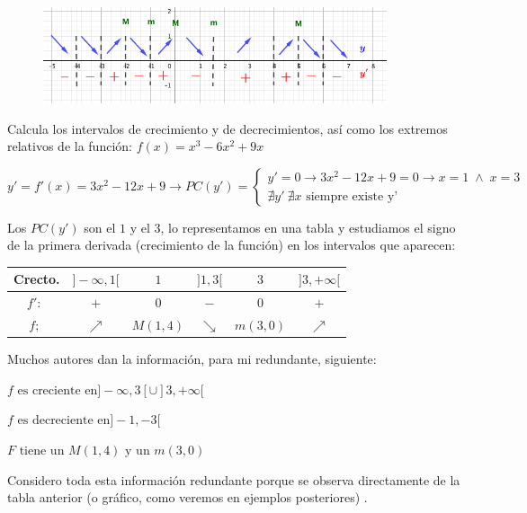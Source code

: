 	
	\begin{figure}[H]
		\centering
		\includegraphics[width=0.9\textwidth]{imagenes/imagenes05/T05IM07.png}
	\end{figure}
	
	\begin{ejem} Calcula los intervalos de crecimiento y de decrecimientos, así como los extremos relativos de la función:  $f(x)=x^3-6x^2+9x$
	
	$y'=f'(x)=3x^2-12 x+9 \to PC(y') =\begin{cases}
	y'=0 \to 3x^2-12x+9=0 \to x=1 \; \wedge \; x=3 \\
	\nexists y' \ \nexists x \mbox{ siempre existe y'}
	\end{cases}$
	
	Los $PC(y')$ son el $1$ y el $3$, lo representamos en una tabla y estudiamos el signo de la primera derivada (crecimiento de la función) en los intervalos que aparecen:
	
	\begin{table}[H]
	\centering
	\begin{tabular}{|c|c|c|c|c|c|}
	\hline
	Crecto. &$]-\infty,1[$  & $1$ & $]1,3[$ & $3$ & $]3,+\infty[$ \\ \hline
 	$f':\; $ &  $+$ & $0$ & $-$ & $0$ & $+$ \\ \hline
 	$f;\;$ & $\nearrow$  & $M(1,4)$ & $\searrow$ & $m(3,0)$ & $\nearrow$ \\ \hline
	\end{tabular}
	\end{table}
	
	Muchos autores dan la información, para mi redundante, siguiente:
	
	\hspace{10mm} $f \mbox{ es creciente en} ]-\infty,3[\cup ]3,+\infty[$
	
	\hspace{10mm} $f \mbox{ es decreciente en} ]-1,-3[$
	
	\hspace{10mm}  $F \mbox{ tiene un } M(1,4) \mbox{ y un } m(3,0)$
	
	Considero toda esta información redundante porque se observa directamente de la tabla anterior (o gráfico, como veremos en ejemplos posteriores) .
	
		
	\end{ejem}
	
